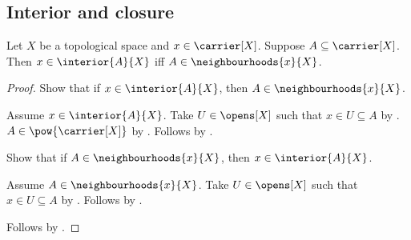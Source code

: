 \subsection{Interior and closure}

\begin{theorem}\label{interior_iff_neighbourhood}
    Let $X$ be a topological space and $x\in\carrier[X]$.
    Suppose $A\subseteq\carrier[X]$.
    Then $x\in\interior{A}{X}$ iff $A\in\neighbourhoods{x}{X}$.
\end{theorem}
\begin{proof}
    Show that if $x\in\interior{A}{X}$, then
        $A\in\neighbourhoods{x}{X}$.
    \begin{subproof}
        Assume $x\in\interior{A}{X}$.
        Take $U\in\opens[X]$ such that $x\in U\subseteq A$ by
            .
        $A\in\pow{\carrier[X]}$ by .
        Follows by .
    \end{subproof}
    Show that if $A\in\neighbourhoods{x}{X}$, then
        $x\in\interior{A}{X}$.
    \begin{subproof}
        Assume $A\in\neighbourhoods{x}{X}$.
        Take $U\in\opens[X]$ such that $x\in U\subseteq A$ by
            .
        Follows by .
    \end{subproof}
    Follows by \auto.
\end{proof}


